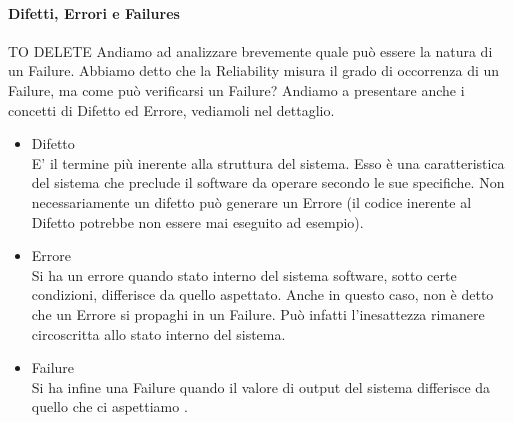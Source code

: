 \paragraph{Difetti, Errori e Failures}
TO DELETE
Andiamo ad analizzare brevemente quale può essere la natura di un Failure. Abbiamo detto che la Reliability misura il grado di occorrenza di un Failure, ma come può verificarsi un Failure? Andiamo a presentare anche i concetti di Difetto ed Errore, vediamoli nel dettaglio.
\begin{itemize}
	\item Difetto \\
	E' il termine più inerente alla struttura del sistema. Esso è una caratteristica del sistema che preclude il software da operare secondo le sue specifiche. Non necessariamente un difetto può generare un Errore (il codice inerente al Difetto potrebbe non essere mai eseguito ad esempio).
	
	\item  Errore \\
	Si ha un errore quando stato interno del sistema software, sotto certe condizioni, differisce da quello aspettato. Anche in questo caso, non è detto che un Errore si propaghi in un Failure. Può infatti l'inesattezza rimanere circoscritta allo stato interno del sistema. 
	
	\item  Failure \\
	Si ha infine una Failure quando il valore di output del sistema differisce da quello che ci aspettiamo .
\end{itemize}


